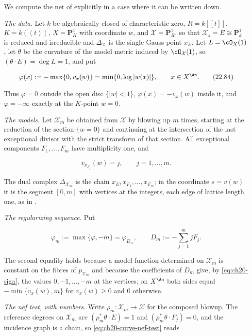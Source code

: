 \begin{example}
\label{ex:ch22-regularization-curve}
We compute the net of  explicitly in
a case where it can be written down.

\emph{The data.}  Let \(k\) be algebraically closed of characteristic zero,
\(R=k[[t]]\), \(K=k((t))\), \(X=\mathbf P^1_K\) with coordinate \(w\), and
\(\mathcal X=\mathbf P^1_R\), so that \(\mathcal X_s=E\cong\mathbf P^1_k\) is
reduced and irreducible and \(\Delta_{\mathcal X}\) is the single Gauss point
\(x_E\).  Let \(L=\cO_X(1)\), let \(\theta\) be the curvature of the model
metric induced by \(\cO_{\mathcal X}(1)\), so \((\theta\cdot E)=\deg L=1\),
and put

\[
 \varphi(x):=-\max\{0,v_x(w)\}
 =\min\{0,\log|w(x)|\},
 \qquad x\in X^{\An}.
\tag{22.84}\label{eq:ch22-green-function}
\]

Thus \(\varphi=0\) outside the open disc \(\{|w|<1\}\), \(\varphi(x)=-v_x(w)\)
inside it, and \(\varphi=-\infty\) exactly at the \(K\)-point \(w=0\).

\emph{The models.}  Let \(\mathcal X_m\) be obtained from \(\mathcal X\) by
blowing up \(m\) times, starting at the reduction of the section
\(\{w=0\}\) and continuing at the intersection of the last exceptional
divisor with the strict transform of that section.  All exceptional
components \(F_1,\ldots,F_m\) have multiplicity one, and

\[
 v_{x_{F_j}}(w)=j,\qquad j=1,\ldots,m .
\]

The dual complex \(\Delta_{\mathcal X_m}\) is the chain
\(x_E,x_{F_1},\ldots,x_{F_m}\); in the coordinate \(s=v(w)\) it is the
segment \([0,m]\) with vertices at the integers, each edge of lattice length
one, as in .

\emph{The regularizing sequence.}  Put

\[
 \varphi_m:=\max\{\varphi,-m\}
 =\varphi_{D_m},
 \qquad
 D_m:=-\sum_{j=1}^{m}jF_j .
\tag{22.85}\label{eq:ch22-truncated-green}
\]

The second equality holds because a model function determined on
\(\mathcal X_m\) is constant on the fibres of \(p_{\mathcal X_m}\) and
because the coefficients of \(D_m\) give, by
\eqref{eq:ch20-sign}, the values \(0,-1,\ldots,-m\) at the vertices; on
\(X^{\An}\) both sides equal \(-\min\{v_x(w),m\}\) for
\(v_x(w)\geq0\) and \(0\) otherwise.

\emph{The nef test, with numbers.}  Write \(\rho_m:\mathcal X_m\to\mathcal X\)
for the composed blowup.  The reference degrees on
\(\mathcal X_m\) are \((\rho_m^*\theta\cdot E)=1\) and
\((\rho_m^*\theta\cdot F_j)=0\), and the incidence graph is a chain, so
\eqref{eq:ch20-curve-nef-test} reads


\end{example}
